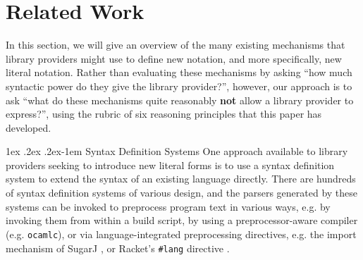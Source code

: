 \documentclass[acmsmall]{acmart}
\makeatletter
\renewcommand{\paragraph}{%
  \@startsection{paragraph}{4}%
  {\z@}{1ex \@plus .2ex \@minus .2ex}{-1em}%
  {\normalfont\normalsize\bfseries}%
}
\newcommand{\li}[1]{\lstinline[basicstyle=\ttfamily\fontsize{9pt}{1em}\selectfont]{#1}}
\makeatother
\begin{document}
\section{Related Work}
\label{sec:existing-approaches}

In this section, we will give an overview of the many existing mechanisms that library providers might use to define new notation, and more specifically, new literal notation. Rather than evaluating these mechanisms by asking ``how much syntactic power do they give the library provider?'', however, our approach is to ask ``what do these mechanisms quite reasonably \textbf{not} allow a library provider to express?'', using the rubric of six reasoning principles that this paper has developed.

\paragraph{Syntax Definition Systems}\label{sec:syntax-dialects-intro}
One approach available to library providers seeking to introduce new literal forms is to use a syntax definition system to extend the syntax of an existing language directly. %
There are hundreds of syntax definition systems of various design, and the parsers generated by these systems can be invoked to preprocess program text in various ways, e.g. by invoking them from within a build script, by using a preprocessor-aware compiler (e.g. \li{ocamlc}), or via language-integrated preprocessing directives, e.g. the import mechanism of SugarJ \cite{erdweg2011sugarj}, or Racket's \li{#lang} directive \cite{Flatt:2012:CLR:2063176.2063195}. %
\end{document}
